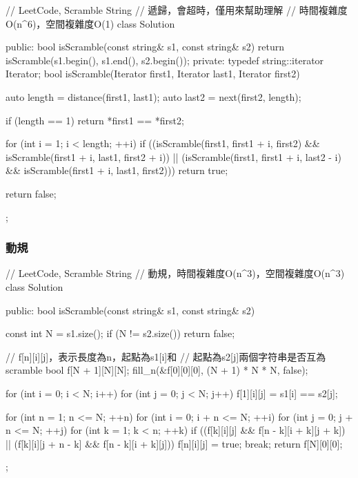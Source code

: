 \begin{Code}
// LeetCode, Scramble String
// 遞歸，會超時，僅用來幫助理解
// 時間複雜度O(n^6)，空間複雜度O(1)
class Solution {
public:
    bool isScramble(const string& s1, const string& s2) {
        return isScramble(s1.begin(), s1.end(), s2.begin());
    }
private:
    typedef string::iterator Iterator;
    bool isScramble(Iterator first1, Iterator last1, Iterator first2) {
        auto length = distance(first1, last1);
        auto last2 = next(first2, length);

        if (length == 1) return *first1 == *first2;

        for (int i = 1; i < length; ++i)
            if ((isScramble(first1, first1 + i, first2)
                 && isScramble(first1 + i, last1, first2 + i))
                    || (isScramble(first1, first1 + i, last2 - i)
                            && isScramble(first1 + i, last1, first2)))
                return true;

        return false;
    }
};
\end{Code}


\subsubsection{動規}
\begin{Code}
// LeetCode, Scramble String
// 動規，時間複雜度O(n^3)，空間複雜度O(n^3)
class Solution {
public:
    bool isScramble(const string& s1, const string& s2) {
        const int N = s1.size();
        if (N != s2.size()) return false;

        // f[n][i][j]，表示長度為n，起點為s1[i]和
        // 起點為s2[j]兩個字符串是否互為scramble
        bool f[N + 1][N][N];
        fill_n(&f[0][0][0], (N + 1) * N * N, false);

        for (int i = 0; i < N; i++)
            for (int j = 0; j < N; j++)
                f[1][i][j] = s1[i] == s2[j];

        for (int n = 1; n <= N; ++n) {
            for (int i = 0; i + n <= N; ++i) {
                for (int j = 0; j + n <= N; ++j) {
                    for (int k = 1; k < n; ++k) {
                        if ((f[k][i][j] && f[n - k][i + k][j + k]) ||
                                (f[k][i][j + n - k] && f[n - k][i + k][j])) {
                            f[n][i][j] = true;
                            break;
                        }
                    }
                }
            }
        }
        return f[N][0][0];
    }
};
\end{Code}


